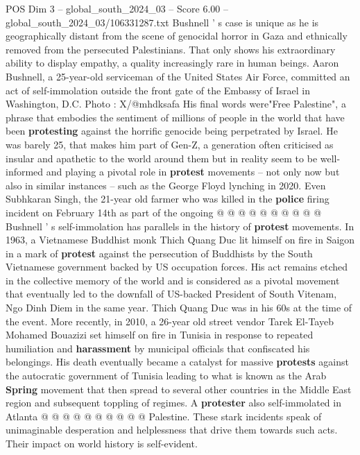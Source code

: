 \begin{textsample}{POS Dim 3 – global\_south\_2024\_03 – Score 6.00 – global\_south\_2024\_03/106331287.txt}  \label{ex:f3_pos_415}
Bushnell ' s case is unique as he is geographically distant from the scene of genocidal horror in Gaza and ethnically removed from the persecuted Palestinians.
That only shows his extraordinary ability to display empathy, a quality increasingly rare in human beings.
Aaron Bushnell, a 25-year-old serviceman of the United States Air Force, committed an act of self-immolation outside the front gate of the Embassy of Israel in Washington, D.C.
Photo : X/@mhdksafa His final words were"Free Palestine", a phrase that embodies the sentiment of millions of people in the world that have been \textbf{protesting} against the horrific genocide being perpetrated by Israel.
He was barely 25, that makes him part of Gen-Z, a generation often criticised as insular and apathetic to the world around them but in reality seem to be well-informed and playing a pivotal role in \textbf{protest} movements -- not only now but also in similar instances -- such as the George Floyd lynching in 2020.
Even Subhkaran Singh, the 21-year old farmer who was killed in the \textbf{police} firing incident on February 14th as part of the ongoing @ @ @ @ @ @ @ @ @ @ Bushnell ' s self-immolation has parallels in the history of \textbf{protest} movements.
In 1963, a Vietnamese Buddhist monk Thich Quang Duc lit himself on fire in Saigon in a mark of \textbf{protest} against the persecution of Buddhists by the South Vietnamese government backed by US occupation forces.
His act remains etched in the collective memory of the world and is considered as a pivotal movement that eventually led to the downfall of US-backed President of South Vitenam, Ngo Dinh Diem in the same year.
Thich Quang Duc was in his 60s at the time of the event.
More recently, in 2010, a 26-year old street vendor Tarek El-Tayeb Mohamed Bouazizi set himself on fire in Tunisia in response to repeated humiliation and \textbf{harassment} by municipal officials that confiscated his belongings.
His death eventually became a catalyst for massive \textbf{protests} against the autocratic government of Tunisia leading to what is known as the Arab \textbf{Spring} movement that then spread to several other countries in the Middle East region and subsequent toppling of regimes.
A \textbf{protester} also self-immolated in Atlanta @ @ @ @ @ @ @ @ @ @ Palestine.
These stark incidents speak of unimaginable desperation and helplessness that drive them towards such acts.
Their impact on world history is self-evident.

\end{textsample}
